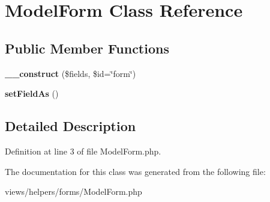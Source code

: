 \hypertarget{class_model_form}{
\section{ModelForm Class Reference}
\label{class_model_form}
}
\subsection*{Public Member Functions}
\begin{DoxyCompactItemize}
\item 
\hypertarget{class_model_form_acb290e974a4b0698456fc5760c409966}{
{\bfseries \_\-\_\-construct} (\$fields, \$id=\char`\"{}form\char`\"{})}
\label{class_model_form_acb290e974a4b0698456fc5760c409966}

\item 
\hypertarget{class_model_form_a19e889cd676bf77dbbc35ffebdf10b11}{
{\bfseries setFieldAs} ()}
\label{class_model_form_a19e889cd676bf77dbbc35ffebdf10b11}

\end{DoxyCompactItemize}


\subsection{Detailed Description}


Definition at line 3 of file ModelForm.php.



The documentation for this class was generated from the following file:\begin{DoxyCompactItemize}
\item 
views/helpers/forms/ModelForm.php\end{DoxyCompactItemize}
